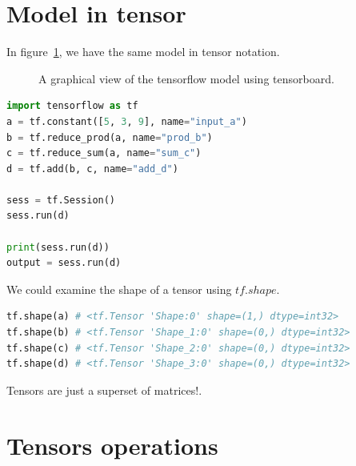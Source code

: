 \documentclass[vecarrow]{svproc}
\begin{document}
\section{Model in tensor}

In figure~\ref{fig:5}, we have the same model in tensor notation.

\begin{figure}
\caption{A graphical view of the tensorflow model using tensorboard.}
\label{fig:5}
\end{figure}

\begin{lstlisting}[language=Python,
caption={model in tensor},label={list2}]
import tensorflow as tf
a = tf.constant([5, 3, 9], name="input_a")
b = tf.reduce_prod(a, name="prod_b")
c = tf.reduce_sum(a, name="sum_c")
d = tf.add(b, c, name="add_d")

sess = tf.Session()
sess.run(d)

print(sess.run(d))
output = sess.run(d)
\end{lstlisting}

We could examine the shape of a tensor using $tf.shape$.
\begin{lstlisting}[language=Python,
caption={shape of tensor},label={list3}]
tf.shape(a) # <tf.Tensor 'Shape:0' shape=(1,) dtype=int32>
tf.shape(b) # <tf.Tensor 'Shape_1:0' shape=(0,) dtype=int32>
tf.shape(c) # <tf.Tensor 'Shape_2:0' shape=(0,) dtype=int32>
tf.shape(d) # <tf.Tensor 'Shape_3:0' shape=(0,) dtype=int32>
\end{lstlisting}

Tensors	are	just	a	superset	of	matrices!.

\section{Tensors operations}
\end{document}
